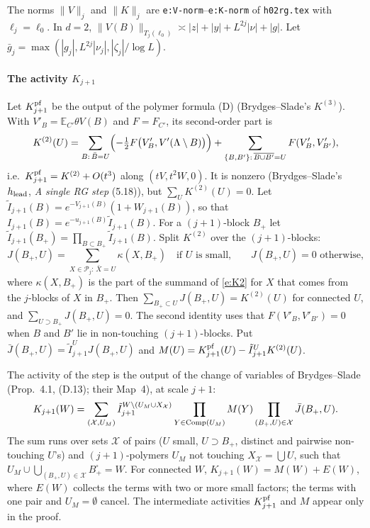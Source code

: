 \documentclass[11pt]{amsart}
\theoremstyle{definition}
\theoremstyle{remark}
\numberwithin{equation}{section}
\newcommand{\E}{\mathbb{E}}
\newcommand{\cP}{\mathcal{P}}
\newcommand{\hr}{\texttt{h02rg.tex}}
\begin{document}
The norms $\|V\|_j$ and $\|K\|_j$ are \texttt{e:V-norm}--\texttt{e:K-norm} of \hr{} with
$\ell_j=\ell_0$. In $d=2$, $\|V(B)\|_{T_j(\ell_0)}\asymp|z|+|y|+L^{2j}|\nu|+|g|$. Let
$\bar g_j=\max(|g_j|,L^{2j}|\nu_j|,|\zeta_j|/\log L)$.

\paragraph{The activity $K_{j+1}$}
Let $K^{\rm pf}_{j+1}$ be the output of the polymer formula (D) (Brydges--Slade's $K^{(3)}$).
With $V'_B=\E_{C'}\theta V(B)$ and $F=F_{C'}$, its second-order part is
\begin{equation}\label{e:K2}
  K^{(2)}(U)=\sum_{B:\,\bar B=U}\Bigl(-\tfrac12F\bigl(V'_B,V'(\Lambda\setminus B)\bigr)\Bigr)
  +\sum_{\{B,B'\}:\,\overline{B\cup B'}=U}F(V'_B,V'_{B'}) ,
\end{equation}
i.e.\ $K^{\rm pf}_{j+1}=K^{(2)}+O(t^3)$ along $(tV,t^2W,0)$. It is nonzero
(Brydges--Slade's $h_{\rm lead}$, \emph{A single RG step} (5.18)), but $\sum_UK^{(2)}(U)=0$. Let
$\tilde I_{j+1}(B)=e^{-V_{j+1}(B)}(1+W_{j+1}(B))$, so that
$I_{j+1}(B)=e^{-u_{j+1}(B)}\tilde I_{j+1}(B)$. For a $(j+1)$-block $B_+$ let
$\tilde I_{j+1}(B_+)=\prod_{B\subset B_+}\tilde I_{j+1}(B)$. Split $K^{(2)}$ over the $(j+1)$-blocks:
\[
  J(B_+,U)=\sum_{X\in\cP_j:\,\bar X=U}\kappa(X,B_+)\quad\text{if $U$ is small,}\qquad J(B_+,U)=0
  \text{ otherwise},
\]
where $\kappa(X,B_+)$ is the part of the summand of \eqref{e:K2} for $X$ that comes from the
$j$-blocks of $X$ in $B_+$. Then $\sum_{B_+\subset U}J(B_+,U)=K^{(2)}(U)$ for connected $U$, and
$\sum_{U\supset B_+}J(B_+,U)=0$. The second identity uses that $F(V'_B,V'_{B'})=0$ when $B$ and
$B'$ lie in non-touching $(j+1)$-blocks. Put $\bar J(B_+,U)=\tilde I^U_{j+1}J(B_+,U)$ and
$M(U)=K^{\rm pf}_{j+1}(U)-\tilde I^U_{j+1}K^{(2)}(U)$.

The activity of the step is the output of the change of variables of Brydges--Slade
(Prop.~4.1, (D.13); their Map~4), at scale $j+1$:
\[
  K_{j+1}(W)=\sum_{(\mathcal X,U_M)}\tilde I_{j+1}^{W\setminus(U_M\cup X_{\mathcal X})}
  \prod_{Y\in{\rm Comp}(U_M)}M(Y)\prod_{(B_+,U)\in\mathcal X}\bar J(B_+,U).
\]
The sum runs over sets $\mathcal X$ of pairs ($U$ small, $U\supset B_+$, distinct and pairwise
non-touching $U$'s) and $(j+1)$-polymers $U_M$ not touching $X_{\mathcal X}=\bigcup U$, such that
$U_M\cup\bigcup_{(B_+,U)\in\mathcal X}B_+^\square=W$. For connected $W$,
$K_{j+1}(W)=M(W)+E(W)$, where $E(W)$ collects the terms with two or more small factors; the terms
with one pair and $U_M=\emptyset$ cancel. The intermediate activities $K^{\rm pf}_{j+1}$ and $M$
appear only in the proof.
\end{document}
